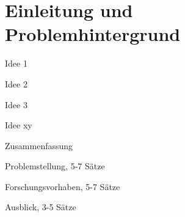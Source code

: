 \chapter{Einleitung und Problemhintergrund}





Idee 1

Idee 2

Idee 3

Idee xy

Zusammenfassung

Problemstellung, 5-7 Sätze

Forschungsvorhaben, 5-7 Sätze

Ausblick, 3-5 Sätze
